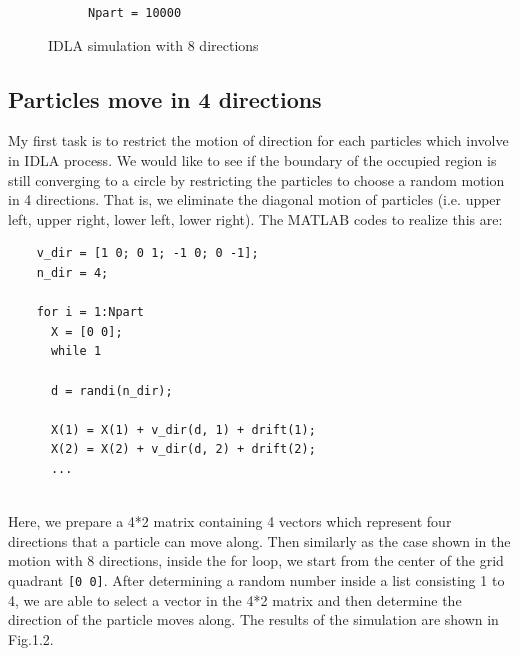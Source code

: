 \documentclass[letterpaper]{article}
\numberwithin{equation}{section} %
\numberwithin{figure}{section} %
\numberwithin{table}{section} %
\begin{document}
\begin{figure}[htbp]
\begin{subfigure}[b]{0.3\textwidth}
		\caption{\texttt{Npart = 10000}}
		\label{8direct_Npart10000_3suW11T}
	\end{subfigure}
	\caption{IDLA simulation with 8 directions}
	\label{IDLA simulation with 8 directions}
\end{figure}
	



\subsection{Particles move in 4 directions}
My first task is to restrict the motion of direction for each particles which involve in IDLA process. We would like to see if the boundary of the occupied region is still converging to a circle by restricting the particles to choose a random motion in 4 directions. That is, we eliminate the diagonal motion of particles (i.e. upper left, upper right, lower left, lower right). The MATLAB codes to realize this are:

\begin{lstlisting}
    v_dir = [1 0; 0 1; -1 0; 0 -1];
    n_dir = 4;
    
    for i = 1:Npart
      X = [0 0];
      while 1
    
      d = randi(n_dir);
    
      X(1) = X(1) + v_dir(d, 1) + drift(1); 
      X(2) = X(2) + v_dir(d, 2) + drift(2);
      ...
      
\end{lstlisting}

\noindent
Here, we prepare a 4*2 matrix containing 4 vectors which represent four directions that a particle can move along. Then similarly as the case shown in the motion with 8 directions, inside the for loop, we start from the center of the grid quadrant \texttt{[0 0]}. After determining a random number inside a list consisting 1 to 4, we are able to select a vector in the 4*2 matrix and then determine the direction of the particle moves along. The results of the simulation are shown in Fig.1.2.
\end{document}
